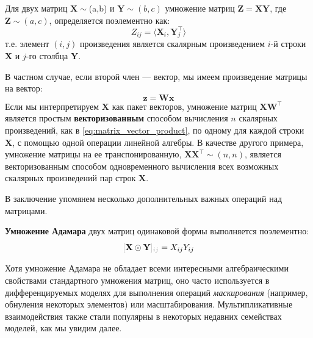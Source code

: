 \begin{definition} \addbottle
Для двух матриц $\mathbf{X}\sim $(a,b) и $\mathbf{Y}\sim (b,c)$ умножение матриц $\mathbf{Z} = \mathbf{X}\mathbf{Y}$, где $\mathbf{Z} \sim (a,c)$, определяется поэлементно как:
%
\begin{equation}
    Z_{ij} = \langle \mathbf{X}_i, \mathbf{Y}^\top_j \rangle
    \label{eq:matrix_multiplication}
\end{equation}
%
\noindent т.е. элемент $(i,j)$ произведения является скалярным произведением $i$-й строки $\mathbf{X}$ и $j$-го столбца $\mathbf{Y}$.
\end{definition}
%
 В частном случае, если второй член — вектор, мы имеем произведение матрицы на вектор:
%
\begin{equation}
\mathbf{z} = \mathbf{W}\mathbf{x}
\label{eq:matrix_vector_product}
\end{equation}
%
Если мы интерпретируем $\mathbf{X}$ как пакет векторов, умножение матриц $\mathbf{X}\mathbf{W}^\top$ является простым \textbf{векторизованным} способом вычисления $n$ скалярных произведений, как в \eqref{eq:matrix_vector_product}, по одному для каждой строки $\mathbf{X}$, с помощью одной операции линейной алгебры. В качестве другого примера, умножение матрицы на ее транспонированную, $\mathbf{X}\mathbf{X}^\top \sim(n,n)$, является векторизованным способом одновременного вычисления всех возможных скалярных произведений пар строк $\mathbf{X}$.

В заключение упомянем несколько дополнительных важных операций над матрицами.

\begin{definition}
\textbf{Умножение Адамара} двух матриц одинаковой формы выполняется поэлементно:
%
\begin{equation*}
\idx{\mathbf{X}\odot \mathbf{Y}}{ij} = {X}_{ij}{Y}_{ij}    
\end{equation*}
\end{definition}
%
Хотя умножение Адамара не обладает всеми интересными алгебраическими свойствами стандартного умножения матриц, оно часто используется в дифференцируемых моделях для выполнения операций \textit{маскирования} (например, обнуления некоторых элементов) или масштабирования. Мультипликативные взаимодействия также стали популярны в некоторых недавних семействах моделей, как мы увидим далее.

